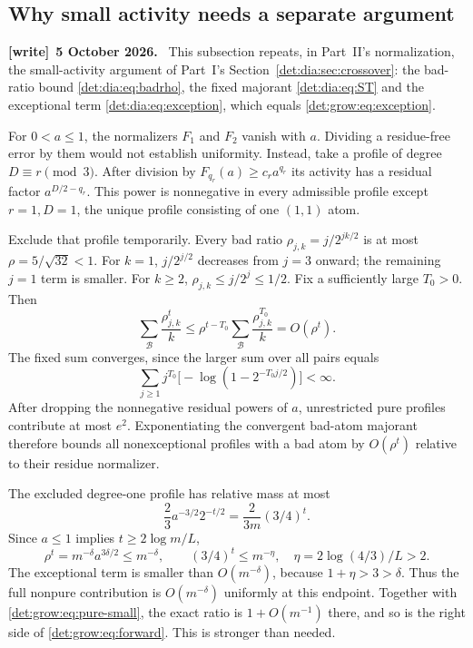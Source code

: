 \documentclass[11pt,letterpaper]{article}
\numberwithin{equation}{section}
\theoremstyle{definition}\newtheorem{definition}[theorem]{Definition}
\theoremstyle{remark}\newtheorem{remark}[theorem]{Remark}
\newcommand{\Bad}{\mathcal B}
\newenvironment{writenote}[1][]{\par\smallskip\begingroup\small
 \noindent\textbf{[write]}\if\relax\detokenize{#1}\relax\else~\textbf{#1.}\fi\ }%
 {\par\endgroup\smallskip}
\begin{document}
\subsection{Why small activity needs a separate argument}
\begin{writenote}[5 October 2026]
This subsection repeats, in Part~II's normalization, the small-activity argument of Part~I's Section~\ref{det:dia:sec:crossover}: the bad-ratio bound \eqref{det:dia:eq:badrho}, the fixed majorant \eqref{det:dia:eq:ST} and the exceptional term \eqref{det:dia:eq:exception}, which equals \eqref{det:grow:eq:exception}.
\end{writenote}
For $0<a\le1$, the normalizers $F_1$ and $F_2$ vanish with $a$.
Dividing a residue-free error by them would not establish uniformity.
Instead, take a profile of degree $D\equiv r\pmod3$. After division by
$F_{q_r}(a)\ge c_r a^{q_r}$ its activity has a residual factor
$a^{D/2-q_r}$. This power is nonnegative in every admissible profile
except $r=1,D=1$, the unique profile consisting of one $(1,1)$ atom.

Exclude that profile temporarily. Every bad ratio
$\rho_{j,k}=j/2^{jk/2}$ is at most $\rho=5/\sqrt{32}<1$.
For $k=1$, $j/2^{j/2}$ decreases from $j=3$ onward; the remaining
$j=1$ term is smaller. For $k\ge2$,
$\rho_{j,k}\le j/2^j\le1/2$. Fix a sufficiently large $T_0>0$.
Then
\begin{equation}\label{det:grow:eq:fixedmajorant}
 \sum_{\Bad}\frac{\rho_{j,k}^t}{k}
 \le\rho^{t-T_0}\sum_{\Bad}\frac{\rho_{j,k}^{T_0}}k
 =O(\rho^t).
\end{equation}
The fixed sum converges, since the larger sum over all pairs equals
\[
 \sum_{j\ge1}j^{T_0}\big[-\log(1-2^{-T_0j/2})\big]<\infty.
\]
After dropping the nonnegative residual powers of $a$, unrestricted
pure profiles contribute at most $e^2$. Exponentiating the convergent
bad-atom majorant therefore bounds all nonexceptional profiles with a
bad atom by $O(\rho^t)$ relative to their residue normalizer.

The excluded degree-one profile has relative mass at most
\begin{equation}\label{det:grow:eq:exception}
 \frac23a^{-3/2}2^{-t/2}=\frac{2}{3m}(3/4)^t.
\end{equation}
Since $a\le1$ implies $t\ge2\log m/L$,
\[
 \rho^t=m^{-\delta}a^{3\delta/2}\le m^{-\delta},\qquad
 (3/4)^t\le m^{-\eta},\quad \eta=2\log(4/3)/L>2.
\]
The exceptional term is smaller than $O(m^{-\delta})$, because
$1+\eta>3>\delta$. Thus the full nonpure contribution is
$O(m^{-\delta})$ uniformly at this endpoint. Together with
\eqref{det:grow:eq:pure-small}, the exact ratio is $1+O(m^{-1})$ there, and so
is the right side of \eqref{det:grow:eq:forward}. This is stronger than needed.
\end{document}
